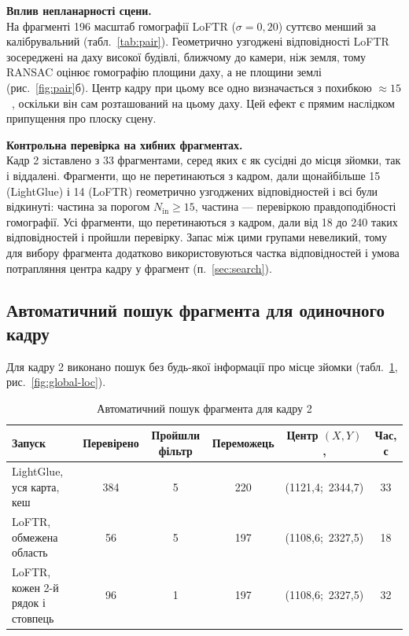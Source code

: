 \documentclass[a4paper, 12pt, titlepage]{article}
\begin{document}
\textbf{Вплив непланарності сцени.}\\
На фрагменті 196 масштаб гомографії LoFTR ($\sigma = 0{,}20$) суттєво менший за калібрувальний (табл.~\ref{tab:pair}). Геометрично узгоджені відповідності LoFTR зосереджені на даху високої будівлі, ближчому до камери, ніж земля, тому RANSAC оцінює гомографію площини даху, а не площини землі (рис.~\ref{fig:pair}б). Центр кадру при цьому все одно визначається з похибкою $\approx 15$~\px{}, оскільки він сам розташований на цьому даху. Цей ефект є прямим наслідком припущення про плоску сцену.

\textbf{Контрольна перевірка на хибних фрагментах.}\\
Кадр 2 зіставлено з 33 фрагментами, серед яких є як сусідні до місця зйомки, так і віддалені. Фрагменти, що не перетинаються з кадром, дали щонайбільше 15 (LightGlue) і 14 (LoFTR) геометрично узгоджених відповідностей і всі були відкинуті: частина за порогом $N_{\text{in}} \ge 15$, частина --- перевіркою правдоподібності гомографії. Усі фрагменти, що перетинаються з кадром, дали від 18 до 240 таких відповідностей і пройшли перевірку. Запас між цими групами невеликий, тому для вибору фрагмента додатково використовуються частка відповідностей і умова потрапляння центра кадру у фрагмент (п.~\ref{sec:search}).

\subsection{Автоматичний пошук фрагмента для одиночного кадру}

Для кадру 2 виконано пошук без будь-якої інформації про місце зйомки (табл.~\ref{tab:search}, рис.~\ref{fig:global-loc}).

\begin{table}[H]
\centering
\caption{Автоматичний пошук фрагмента для кадру 2}
\label{tab:search}
\small
\begin{tabular}{lccccc}
\toprule
\textbf{Запуск} & \textbf{Перевірено} & \textbf{Пройшли фільтр} & \textbf{Переможець} & \textbf{Центр $(X, Y)$, \px{}} & \textbf{Час, с} \\
\midrule
LightGlue, уся карта, кеш & 384 & 5 & 220 & (1121,4;\ 2344,7) & 33 \\
LoFTR, обмежена область & 56 & 5 & 197 & (1108,6;\ 2327,5) & 18 \\
LoFTR, кожен 2-й рядок і стовпець & 96 & 1 & 197 & (1108,6;\ 2327,5) & 32 \\
\bottomrule
\end{tabular}
\end{table}
\end{document}
